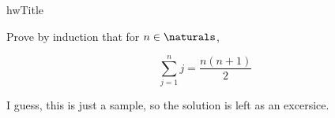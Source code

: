 \documentclass{article}
\newcommand{\basedir}{..}
\begin{document}
{hwTitle}
\let\basedir\undefined

\problemsec

Prove by induction that for $n\in\naturals$,

\[
\sum_{j=1}^n j=\frac{n(n+1)}{2}
\]

\solution

I guess, this is just a sample, so the solution is left as an excersice.
\end{document}
